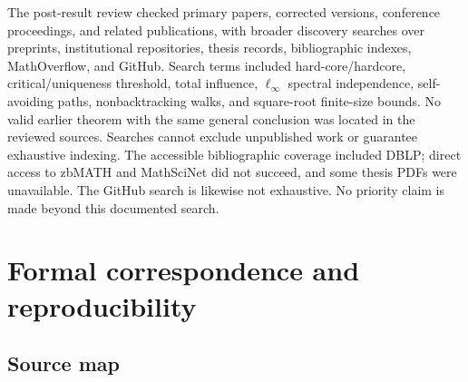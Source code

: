 \documentclass[11pt]{article}
\theoremstyle{definition}
\begin{document}
The post-result review checked primary papers, corrected versions,
conference proceedings, and related publications, with broader discovery
searches over preprints, institutional repositories, thesis records,
bibliographic indexes, MathOverflow, and GitHub. Search terms included
hard-core/hardcore, critical/uniqueness threshold, total influence,
$\ell_\infty$ spectral independence, self-avoiding paths, nonbacktracking
walks, and square-root finite-size bounds. No valid earlier theorem with
the same general conclusion was located in the reviewed sources. Searches
cannot exclude unpublished work or guarantee exhaustive indexing. The
accessible bibliographic coverage included DBLP; direct access to zbMATH
and MathSciNet did not succeed, and some thesis PDFs were unavailable.
The GitHub search is likewise not exhaustive. No priority
claim is made beyond this documented search.

\section{Formal correspondence and reproducibility}

\subsection{Source map}
\end{document}
